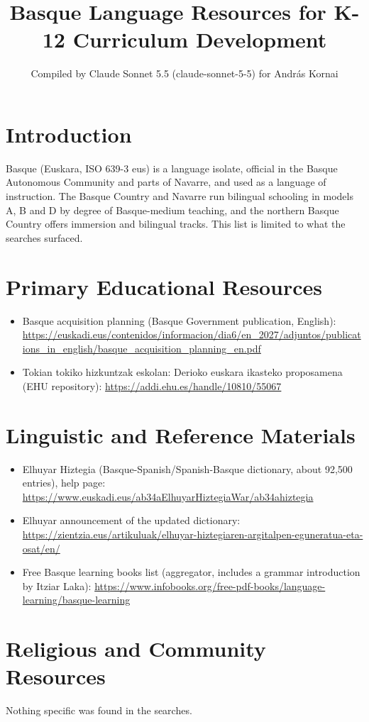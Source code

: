 \documentclass[12pt]{article}
\title{Basque Language Resources for K-12 Curriculum Development}
\author{Compiled by Claude Sonnet 5.5 (claude-sonnet-5-5) for Andr\'as Kornai}
\date{}
\begin{document}
\maketitle

\section{Introduction}
Basque (Euskara, ISO 639-3 eus) is a language isolate, official in the Basque Autonomous Community and parts of Navarre, and used as a language of instruction. The Basque Country and Navarre run bilingual schooling in models A, B and D by degree of Basque-medium teaching, and the northern Basque Country offers immersion and bilingual tracks. This list is limited to what the searches surfaced.

\section{Primary Educational Resources}
\begin{itemize}
\item Basque acquisition planning (Basque Government publication, English): \url{https://euskadi.eus/contenidos/informacion/dia6/en_2027/adjuntos/publications_in_english/basque_acquisition_planning_en.pdf}
\item Tokian tokiko hizkuntzak eskolan: Derioko euskara ikasteko proposamena (EHU repository): \url{https://addi.ehu.es/handle/10810/55067}
\end{itemize}

\section{Linguistic and Reference Materials}
\begin{itemize}
\item Elhuyar Hiztegia (Basque-Spanish/Spanish-Basque dictionary, about 92,500 entries), help page: \url{https://www.euskadi.eus/ab34aElhuyarHiztegiaWar/ab34ahiztegia}
\item Elhuyar announcement of the updated dictionary: \url{https://zientzia.eus/artikuluak/elhuyar-hiztegiaren-argitalpen-eguneratua-eta-osat/en/}
\item Free Basque learning books list (aggregator, includes a grammar introduction by Itziar Laka): \url{https://www.infobooks.org/free-pdf-books/language-learning/basque-learning}
\end{itemize}

\section{Religious and Community Resources}
Nothing specific was found in the searches.
\end{document}
